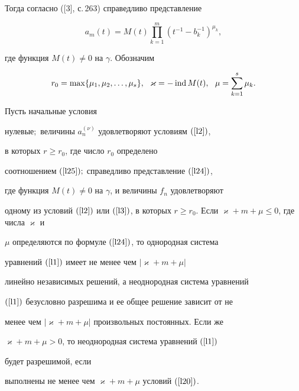Тогда согласно ([3], с.\,263) справедливо представление


\begin{equation}


\label{l24}


a_m(t)=M(t)\prod_{k=1}^m (t^{-1}-b_k^{-1})^{\mu_k},


\end{equation}


где функция $M(t)\ne0$ на $\gamma$. Обозначим


\begin{equation}


\label{l25}


r_0=\max \{\mu_1,\mu_2,\dotsc,\mu_s\},\ \ \varkappa=-\ind M(t),


\ \ \mu=\sum_{k=1}^s \mu_k.


\end{equation}








\begin{thm}


Пусть начальные условия


нулевые\/$;$ величины $a_n^{(\nu)}$ удовлетворяют условиям $(\ref{l2})$,


в которых $r\geqslant r_0$, где число $r_0$ определено


соотношением $(\ref{l25});$ справедливо представление $(\ref{l24})$,


где функция $M(t)\ne0$ на $\gamma$, и величины $f_n$ удовлетворяют


одному из условий $(\ref{l2})$ или $(\ref{l3})$, в которых $r\geqslant


r_0$. Если $\varkappa+m+\mu\leqslant 0$, где числа $\varkappa$ и


$\mu$ определяются по формуле $(\ref{l24})$, то однородная система


уравнений $(\ref{l1})$ имеет не менее чем $|\varkappa+m+\mu|$


линейно независимых решений, а неоднородная система уравнений


$(\ref{l1})$ безусловно разрешима и ее общее решение зависит от не


менее чем $|\varkappa+m+\mu|$ произвольных постоянных. Если же


$\varkappa+m+\mu>0$, то неоднородная система уравнений $(\ref{l1})$


будет разрешимой, если


выполнены не менее чем $\varkappa+m+\mu$ условий $(\ref{l20})$.


\end{thm}








